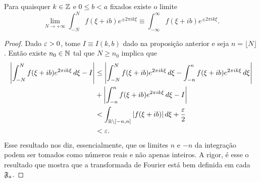         \begin{corolario}
            Para quaisquer $k\in\mathbb{Z}$ e $0\leq b < a$ fixados existe o limite
            \begin{equation*}
                \lim_{N\to +\infty} \int_{-N}^N f(\xi + ib) e^{\pm 2\pi ik\xi} 
                \equiv \int_{-\infty}^{\infty} f(\xi + ib) e^{\pm 2\pi ik\xi}.
            \end{equation*}
        \end{corolario}
        \begin{proof}
            Dado $\varepsilon>0$, tome $I\equiv I(k,b)$ dado na proposição anterior e seja $n = \lfloor N \rfloor$. 
            Então existe $n_0\in\mathbb{N}$ tal que $N\geq n_0$ implica que
            \begin{align*}
                \left| \int_{-N}^N f(\xi + ib)e^{2\pi ik\xi} \, d\xi - I \right| 
                &\leq \left| \int_{-N}^N f(\xi + ib)e^{2\pi ik\xi} \, d\xi 
                - \int_{-n}^n f(\xi + ib)e^{2\pi ik\xi} \, d\xi \right| \\
                &+ \left| \int_{-n}^n f(\xi + ib)e^{2\pi ik\xi} \, d\xi - I \right| \\
                &< \int_{\mathbb{R}\setminus[-n,n]} |f(\xi + ib)| \, d\xi + \frac{\varepsilon}{2} \\
                &< \varepsilon.
            \end{align*}
            Esse resultado nos diz, essencialmente, que os limites $n$ e $-n$ da integração podem
            ser tomados como números reais e não apenas inteiros. A rigor, é esse o resultado que mostra
            que a transformada de Fourier está bem definida em cada $\mathfrak{F}_a$.
        \end{proof}
